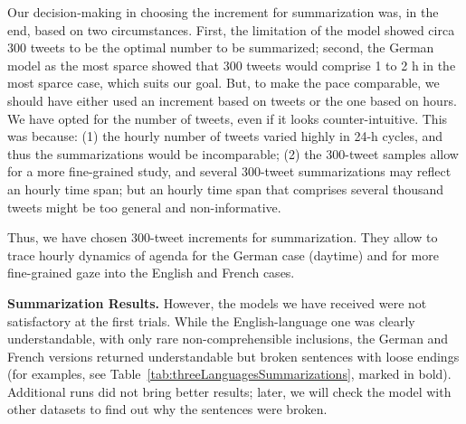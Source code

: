 Our decision-making in choosing the increment for summarization was, in the end, based on two circumstances. First, the limitation of the model showed circa 300 tweets to be the optimal number to be summarized; second, the German model as the most sparce showed that 300 tweets would comprise 1 to 2 h in the most sparce case, which suits our goal. But, to make the pace comparable, we should have either used an increment based on tweets or the one based on hours.
We have opted for the number of tweets, even if it looks counter-intuitive. This was because: (1) the hourly number of tweets varied highly in 24-h cycles, and thus the summarizations would be incomparable; (2) the 300-tweet samples allow for a more fine-grained study, and several 300-tweet summarizations may reflect an hourly time span; but an hourly time span that comprises several thousand tweets might be too general and non-informative.

Thus, we have chosen 300-tweet increments for summarization. They allow to trace hourly dynamics of agenda for the German case (daytime) and for more fine-grained gaze into the English and French cases.

\textbf{Summarization Results.} However, the models we have received were not satisfactory at the first trials. While the English-language one was clearly understandable, with only rare non-comprehensible inclusions, the German and French versions returned understandable but broken sentences with loose endings (for examples, see Table~\cref{tab:threeLanguagesSummarizations}, marked in bold). Additional runs did not bring better results; later, we will check the model with other datasets to find out why the sentences were broken.

